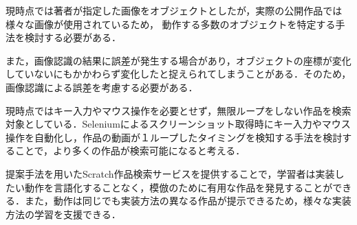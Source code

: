 \documentclass[twocolumn, a4paper, 9pt]{jarticle}
\begin{document}
現時点では著者が指定した画像をオブジェクトとしたが，実際の公開作品では様々な画像が使用されているため，
動作する多数のオブジェクトを特定する手法を検討する必要がある．

また，画像認識の結果に誤差が発生する場合があり，オブジェクトの座標が変化していないにもかかわらず変化したと捉えられてしまうことがある．そのため，画像認識による誤差を考慮する必要がある．

現時点ではキー入力やマウス操作を必要とせず，無限ループをしない作品を検索対象としている．Seleniumによるスクリーンショット取得時にキー入力やマウス操作を自動化し，作品の動画が１ループしたタイミングを検知する手法を検討することで，より多くの作品が検索可能になると考える．

提案手法を用いたScratch作品検索サービスを提供することで，学習者は実装したい動作を言語化することなく，模倣のために有用な作品を発見することができる．また，動作は同じでも実装方法の異なる作品が提示できるため，様々な実装方法の学習を支援できる．



\end{document}
